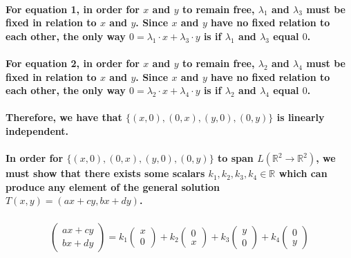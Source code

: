 \documentclass{article}
\begin{document}
\paragraph{\large
For equation 1, in order for $x$ and $y$ to remain free, $\lambda_1$ and $\lambda_3$ must be fixed in relation to $x$ and $y$. Since $x$ and $y$ have no fixed relation to each other, the only way $0 = \lambda_1 \cdot x + \lambda_3 \cdot y$ is if $\lambda_1$ and $\lambda_3$ equal $0$.}

\paragraph{\large
For equation 2, in order for $x$ and $y$ to remain free, $\lambda_2$ and $\lambda_4$ must be fixed in relation to $x$ and $y$. Since $x$ and $y$ have no fixed relation to each other, the only way $0 = \lambda_2 \cdot x + \lambda_4 \cdot y$ is if $\lambda_2$ and $\lambda_4$ equal $0$.}

\paragraph{\large
Therefore, we have that $\{(x, 0), (0, x), (y, 0), (0, y)\}$ is linearly independent.}

\paragraph{\large
In order for $\{(x, 0), (0, x), (y, 0), (0, y)\}$ to span $L(\mathbb{R}^2 \rightarrow \mathbb{R}^2)$, we must show that there exists some scalars $k_1,k_2,k_3,k_4 \in \mathbb{R}$ which can produce any element of the general solution $T(x,y) = (ax + cy, bx + dy)$.}

\begin{align*}
\begin{pmatrix}
    ax+cy \\ bx+dy
\end{pmatrix}
= k_1
\begin{pmatrix}
    x \\ 0
\end{pmatrix}
+ k_2
\begin{pmatrix}
    0 \\ x
\end{pmatrix}
+ k_3
\begin{pmatrix}
    y \\ 0
\end{pmatrix}
+ k_4
\begin{pmatrix}
    0 \\ y
\end{pmatrix}
\end{align*}
\end{document}
